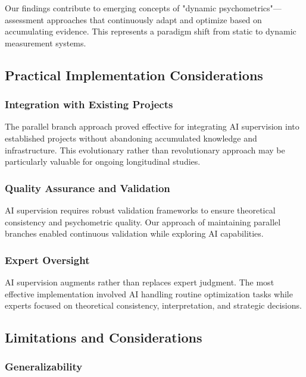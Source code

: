 \documentclass[12pt,a4paper]{article}
\begin{document}
Our findings contribute to emerging concepts of "dynamic psychometrics"—assessment approaches that continuously adapt and optimize based on accumulating evidence. This represents a paradigm shift from static to dynamic measurement systems.

\subsection{Practical Implementation Considerations}

\subsubsection{Integration with Existing Projects}

The parallel branch approach proved effective for integrating AI supervision into established projects without abandoning accumulated knowledge and infrastructure. This evolutionary rather than revolutionary approach may be particularly valuable for ongoing longitudinal studies.

\subsubsection{Quality Assurance and Validation}

AI supervision requires robust validation frameworks to ensure theoretical consistency and psychometric quality. Our approach of maintaining parallel branches enabled continuous validation while exploring AI capabilities.

\subsubsection{Expert Oversight}

AI supervision augments rather than replaces expert judgment. The most effective implementation involved AI handling routine optimization tasks while experts focused on theoretical consistency, interpretation, and strategic decisions.

\subsection{Limitations and Considerations}

\subsubsection{Generalizability}
\end{document}
